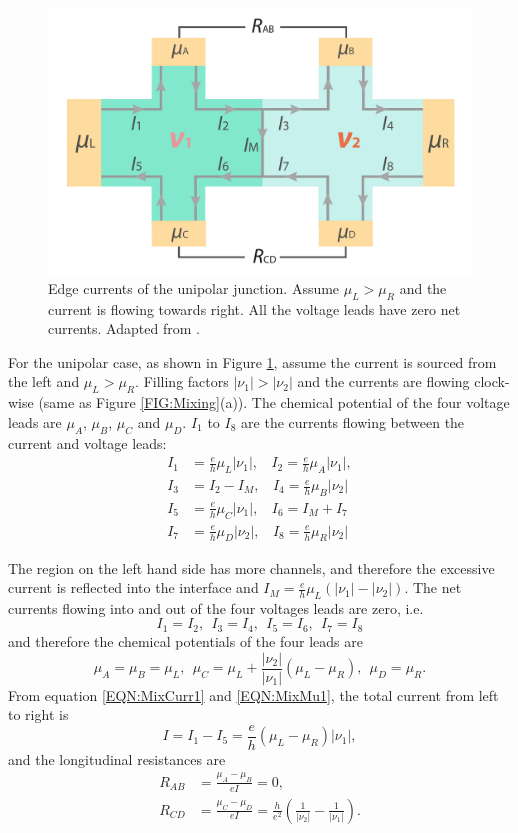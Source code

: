 \documentclass[pdflatex, sectionletters, 12pt]{pittetd}    %
\begin{document}
\begin{figure}[h!]
	\centering
	\includegraphics[width=.7\textwidth]{Drawing/Unipolar.pdf}
	\caption{Edge currents of the unipolar junction. Assume $\mu_L > \mu_R$ and the current is flowing towards right. All the voltage leads have zero net currents. Adapted from \cite{li2019reconfigurable}.}
	\label{FIG:Unipolar}
\end{figure}

For the unipolar case, as shown in Figure \ref{FIG:Unipolar}, assume the current is sourced from the left and $\mu_L > \mu_R$. Filling factors $|\nu_1| > |\nu_2|$ and the currents are flowing clock-wise (same as Figure \ref{FIG:Mixing}(a)). The chemical potential of the four voltage leads are $\mu_A$, $\mu_B$, $\mu_C$ and $\mu_D$. $I_1$ to $I_8$ are the currents flowing between the current and voltage leads:
\begin{equation}
\label{EQN:MixCurr1}
\begin{split}
I_1 & = \frac{e}{h}\mu_L|\nu_1|, \ \ \ \  I_2 = \frac{e}{h}\mu_A|\nu_1|, \\
I_3 & = I_2 - I_M, \ \ \ \ I_4 = \frac{e}{h}\mu_B|\nu_2| \\
I_5 & = \frac{e}{h}\mu_C|\nu_1|, \ \ \ \ I_6 = I_M + I_7 \\
I_7 & = \frac{e}{h}\mu_D|\nu_2|, \ \ \ \ I_8 = \frac{e}{h}\mu_R|\nu_2|
\end{split}
\end{equation}

The region on the left hand side has more channels, and therefore the excessive current is reflected into the interface and $I_M = \frac{e}{h}\mu_L(|\nu_1|-|\nu_2|)$. The net currents flowing into and out of the four voltages leads are zero, i.e.
$$
I_1 = I_2, \ \ I_3 = I_4, \ \ I_5 = I_6, \ \ I_7 = I_8
$$
and therefore the chemical potentials of the four leads are
\begin{equation}
\label{EQN:MixMu1}
\mu_A = \mu_B = \mu_L, \ \ \mu_C = \mu_L + \frac{|\nu_2|}{|\nu_1|}(\mu_L - \mu_R), \ \ \mu_D = \mu_R.
\end{equation}
From equation \ref{EQN:MixCurr1} and \ref{EQN:MixMu1}, the total current from left to right is 
$$
I = I_1 - I_5 = \frac{e}{h}(\mu_L - \mu_R)|\nu_1|,
$$ 
and the longitudinal resistances are 
\begin{equation}
\label{EQN:Mixing1}
\begin{split}
R_{AB} & = \frac{\mu_A - \mu_B}{eI} = 0, \\
R_{CD} & = \frac{\mu_C - \mu_D}{eI} = \frac{h}{e^2}\left(\frac{1}{|\nu_2|} - \frac{1}{|\nu_1|}\right).
\end{split}
\end{equation}
\end{document}
